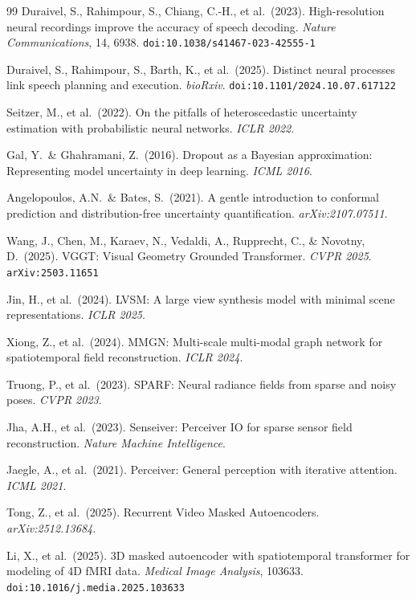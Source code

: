 \documentclass[11pt,letterpaper]{article}
\begin{document}
\begin{thebibliography}{99}
Duraivel, S., Rahimpour, S., Chiang, C.-H., et al.\ (2023).
High-resolution neural recordings improve the accuracy of speech decoding.
\textit{Nature Communications}, 14, 6938.
\texttt{doi:10.1038/s41467-023-42555-1}

Duraivel, S., Rahimpour, S., Barth, K., et al.\ (2025).
Distinct neural processes link speech planning and execution.
\textit{bioRxiv}.
\texttt{doi:10.1101/2024.10.07.617122}

Seitzer, M., et al.\ (2022).
On the pitfalls of heteroscedastic uncertainty estimation with probabilistic neural networks.
\textit{ICLR 2022}.

Gal, Y.\ \& Ghahramani, Z.\ (2016).
Dropout as a Bayesian approximation: Representing model uncertainty in deep learning.
\textit{ICML 2016}.

Angelopoulos, A.N.\ \& Bates, S.\ (2021).
A gentle introduction to conformal prediction and distribution-free uncertainty quantification.
\textit{arXiv:2107.07511}.

Wang, J., Chen, M., Karaev, N., Vedaldi, A., Rupprecht, C., \& Novotny, D.\ (2025).
VGGT: Visual Geometry Grounded Transformer.
\textit{CVPR 2025}.
\texttt{arXiv:2503.11651}

Jin, H., et al.\ (2024).
LVSM: A large view synthesis model with minimal scene representations.
\textit{ICLR 2025}.

Xiong, Z., et al.\ (2024).
MMGN: Multi-scale multi-modal graph network for spatiotemporal field reconstruction.
\textit{ICLR 2024}.

Truong, P., et al.\ (2023).
SPARF: Neural radiance fields from sparse and noisy poses.
\textit{CVPR 2023}.

Jha, A.H., et al.\ (2023).
Senseiver: Perceiver IO for sparse sensor field reconstruction.
\textit{Nature Machine Intelligence}.

Jaegle, A., et al.\ (2021).
Perceiver: General perception with iterative attention.
\textit{ICML 2021}.

Tong, Z., et al.\ (2025).
Recurrent Video Masked Autoencoders.
\textit{arXiv:2512.13684}.

Li, X., et al.\ (2025).
3D masked autoencoder with spatiotemporal transformer for modeling of 4D fMRI data.
\textit{Medical Image Analysis}, 103633.
\texttt{doi:10.1016/j.media.2025.103633}


\end{thebibliography}
\end{document}
